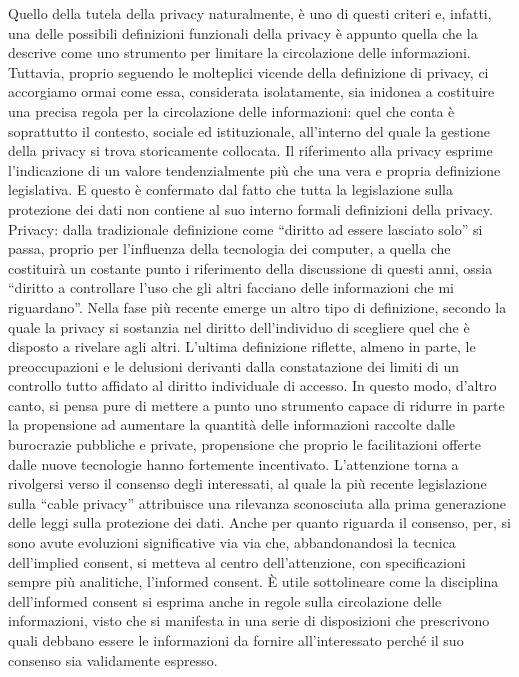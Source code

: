 Quello della tutela della privacy naturalmente, è uno di questi criteri e, infatti, una delle possibili definizioni funzionali della privacy è appunto quella che la descrive come uno strumento per limitare la circolazione delle informazioni. Tuttavia, proprio seguendo le molteplici vicende della definizione di privacy, ci accorgiamo ormai come essa, considerata isolatamente, sia inidonea a costituire una precisa regola per la circolazione delle informazioni: quel che conta è soprattutto il contesto, sociale ed istituzionale, all’interno del quale la gestione della privacy si trova storicamente collocata. Il riferimento alla privacy esprime l’indicazione di un valore tendenzialmente più che una vera e propria definizione legislativa. E questo è confermato dal fatto che tutta la legislazione sulla protezione dei dati non contiene al suo interno formali definizioni della privacy.
Privacy: dalla tradizionale definizione come “diritto ad essere lasciato solo” si passa, proprio per l’influenza della tecnologia dei computer, a quella che costituirà un costante punto i riferimento della discussione di questi anni, ossia “diritto a controllare l’uso che gli altri facciano delle informazioni che mi riguardano”. Nella fase più recente emerge un altro tipo di definizione, secondo la quale la privacy si sostanzia nel diritto dell’individuo di scegliere quel che è disposto a rivelare agli altri. L’ultima definizione riflette, almeno in parte, le preoccupazioni e le delusioni derivanti dalla constatazione dei limiti di un controllo tutto affidato al diritto individuale di accesso. In questo modo, d’altro canto, si pensa pure di mettere a punto uno strumento capace di ridurre in parte la propensione ad aumentare la quantità delle informazioni raccolte dalle burocrazie pubbliche e private, propensione che proprio le facilitazioni offerte dalle nuove tecnologie hanno fortemente incentivato.
L’attenzione torna a rivolgersi verso il consenso degli interessati, al quale la più recente legislazione sulla “cable privacy” attribuisce una rilevanza sconosciuta alla prima generazione delle leggi sulla protezione dei dati. Anche per quanto riguarda il consenso, per, si sono avute evoluzioni significative via via che, abbandonandosi la tecnica dell’implied consent, si metteva al centro dell’attenzione, con specificazioni sempre più analitiche, l’informed consent.
È utile sottolineare come la disciplina dell’informed consent si esprima anche in regole sulla circolazione delle informazioni, visto che si manifesta in una serie di disposizioni che prescrivono quali debbano essere le informazioni da fornire all’interessato perché il suo consenso sia validamente espresso.

